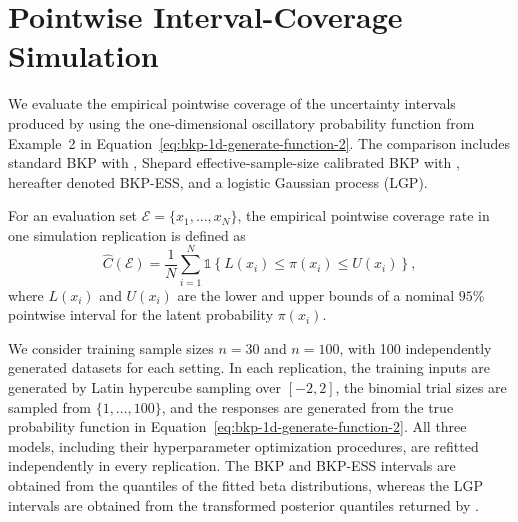 \documentclass[article, shortnames]{jss}
\begin{document}
%






\newpage
\appendix
\section{Pointwise Interval-Coverage Simulation} \label{app:coverage}

We evaluate the empirical pointwise coverage of the uncertainty intervals produced by  using the one-dimensional oscillatory probability function from Example~2 in Equation~\ref{eq:bkp-1d-generate-function-2}. The comparison includes standard BKP with , Shepard effective-sample-size calibrated BKP with , hereafter denoted BKP-ESS, and a logistic Gaussian process (LGP).

For an evaluation set $\mathcal{E}=\{x_1,\ldots,x_N\}$, the empirical pointwise coverage rate in one simulation replication is defined as
\[
\widehat{C}(\mathcal{E})=
\frac{1}{N}\sum_{i=1}^{N}
\mathds{1}\left\{L(x_i)\leq\pi(x_i)\leq U(x_i)\right\},
\]
where $L(x_i)$ and $U(x_i)$ are the lower and upper bounds of a nominal $95\%$ pointwise interval for the latent probability $\pi(x_i)$.

We consider training sample sizes $n=30$ and $n=100$, with 100 independently generated datasets for each setting. In each replication, the training inputs are generated by Latin hypercube sampling over $[-2,2]$, the binomial trial sizes are sampled from $\{1,\ldots,100\}$, and the responses are generated from the true probability function in Equation~\ref{eq:bkp-1d-generate-function-2}. All three models, including their hyperparameter optimization procedures, are refitted independently in every replication. The BKP and BKP-ESS intervals are obtained from the quantiles of the fitted beta distributions, whereas the LGP intervals are obtained from the transformed posterior quantiles returned by .
\end{document}
